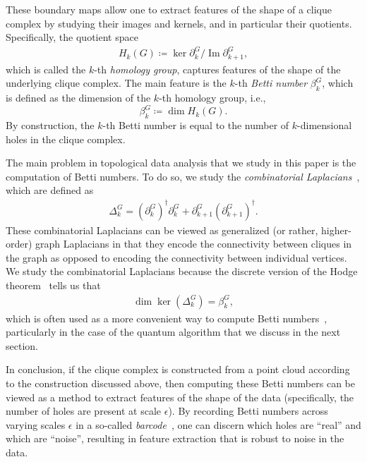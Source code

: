 \documentclass[a4paper, onecolumn, accepted=2022-08-28]{quantumarticle}
\DeclareMathOperator{\Ima}{Im}
\begin{document}
These boundary maps allow one to extract features of the shape of a clique complex by studying their images and kernels, and in particular their quotients.
Specifically, the quotient space
\begin{align}
  H_k(G) \coloneqq \ker\partial_k^G /\Ima \partial_{k+1}^G,
  \label{eq:homology_group}
\end{align}
which is called the $k$-th \emph{homology group}, captures features of the shape of the underlying clique complex.
The main feature is the $k$-th \emph{Betti number} $\beta_k^G$, which is defined as the dimension of the $k$-th homology group, i.e., 
\[
\beta_k^G \coloneqq \dim H_k(G).
\]
By construction, the $k$-th Betti number is equal to the number of $k$-dimensional holes in the clique complex.

The main problem in topological data analysis that we study in this paper is the computation of Betti numbers.
To do so, we study the \emph{combinatorial Laplacians}~\cite{eckmann:comb_lapl}, which are defined as
\begin{align}
\label{eq:comb_lapl}
\Delta_k^G= \left(\partial_k^G\right)^\dagger\partial^G_k + \partial_{k+1}^G\left(\partial_{k+1}^G\right)^\dagger.
\end{align}
These combinatorial Laplacians can be viewed as generalized (or rather, higher-order) graph Laplacians in that they encode the connectivity between cliques in the graph as opposed to encoding the connectivity between individual vertices.
We study the combinatorial Laplacians because the discrete version of the Hodge theorem~\cite{eckmann:comb_lapl} tells us that
\begin{align}
  \dim\ker\left(\Delta_k^G\right) = \beta_k^G,
  \label{eq:hodge}
\end{align}
which is often used as a more convenient way to compute Betti numbers~\cite{friedman:computing_betti}, particularly in the case of the quantum algorithm that we discuss in the next section.

In conclusion, if the clique complex is constructed from a point cloud according to the construction discussed above, then computing these Betti numbers can be viewed as a method to extract features of the shape of the data (specifically, the number of holes are present at scale $\epsilon$).
By recording Betti numbers across varying scales $\epsilon$ in a so-called \emph{barcode}~\cite{ghrist:barcodes}, one can discern which holes are ``real'' and which are ``noise'', resulting in feature extraction that is robust to noise in the data.
\end{document}
